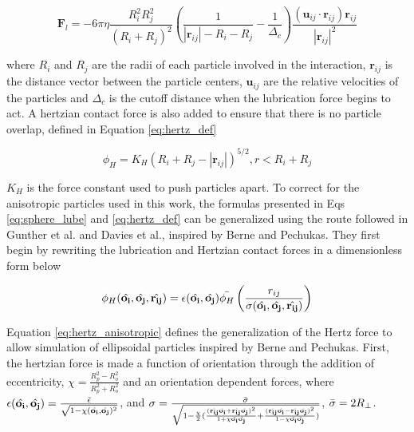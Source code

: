 \begin{equation}
    \mathbf{F}_l = -6\pi \eta \frac{R_{i}^{2} R_{j}^{2}}{(R_i + R_j)^2}(\frac{1}{|\mathbf{r}_{ij}| -R_i - R_j} -\frac{1}{\Delta_c}) \frac{(\mathbf{u}_{ij}\cdot\mathbf{r}_{ij})\mathbf{r}_{ij}}{|\mathbf{r}_{ij}|^2}
    \label{eq:sphere_lube}
\end{equation}

where $R_i$ and $R_j$ are the radii of each particle involved in the interaction, $\mathbf{r}_{ij}$ is the distance
 vector between the particle centers, $\mathbf{u}_{ij}$ are the relative velocities of the particles and $\Delta_c$ 
 is the cutoff distance when the lubrication force begins to act. A hertzian contact force is also added to ensure 
 that there is no particle overlap, defined in Equation \ref{eq:hertz_def}

\begin{equation}
    \phi_{H} = K_{H}(R_i + R_j - |\mathbf{r}_{ij}|)^{5/2}, r < R_i + R_j
    \label{eq:hertz_def}
\end{equation}

$K_H$ is the force constant used to push particles apart. To correct for the anisotropic particles used in this work, 
the formulas presented in Eqs \ref{eq:sphere_lube} and \ref{eq:hertz_def} can be generalized using the route followed 
in Gunther et al. and Davies et al., inspired by Berne and Pechukas. \cite{gunther_timescales_2014, davies_interface_2014} 
They first begin by rewriting the lubrication and Hertzian contact forces in a dimensionless form below

\begin{equation}
    \phi_{H}(\hat{\mathbf{o_i}}, \hat{\mathbf{o_j}}, \hat{\mathbf{r_{ij}}}) = \epsilon(\hat{\mathbf{o_i}}, 
    \hat{\mathbf{o_j}})\Bar{\phi_{H}}\left( \frac{r_{ij}}{\sigma(\hat{\mathbf{o_i}}, \hat{\mathbf{o_j}}, 
    \hat{\mathbf{r_{ij}}})} \right)
    \label{eq:hertz_anisotropic}
\end{equation}

Equation \ref{eq:hertz_anisotropic} defines the generalization of the Hertz force to allow simulation of ellipsoidal 
particles inspired by Berne and Pechukas. First, the hertzian force is made a function of orientation through the 
addition of eccentricity, $\chi = \frac{R_p^2 - R_o^2}{R_p^2 + R_o^2}$ and an orientation dependent forces, where 
$\epsilon(\hat{\mathbf{o_i}}, \hat{\mathbf{o_j}}) = \frac{\Bar{\epsilon}}{\sqrt{1 - \chi(\hat{\mathbf{o_i}}, 
\hat{\mathbf{o_j}})^2}}$, and $\sigma = \frac{\Bar{\sigma}}{\sqrt{1 - \frac{\chi}{2}( 
\frac{(\hat{\mathbf{r_{ij}}}\hat{\mathbf{o_i}} +  \hat{\mathbf{r_{ij}}}\hat{\mathbf{o_j}})^2}{1 + 
\chi \hat{\mathbf{o_i}}\hat{\mathbf{o_j}}} +  \frac{(\hat{\mathbf{r_{ij}}}\hat{\mathbf{o_i}} -  
\hat{\mathbf{r_{ij}}}\hat{\mathbf{o_j}})^2}{1 - \chi \hat{\mathbf{o_i}}\hat{\mathbf{o_j}}})}}$, 
$\Bar{\sigma} = 2R_{\perp}$. \cite{gunther_lattice_2013, gunther_timescales_2014, davies_assembling_2014}


